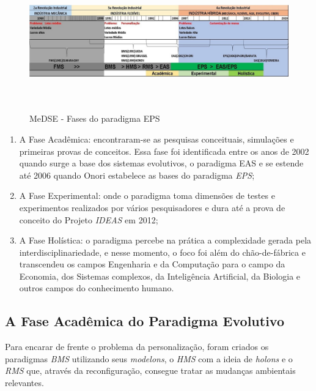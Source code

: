 \begin{figure}[h]
	\centering
	\includegraphics[width=\textwidth, height=6cm]{img/F11_SIAPE_Fases_EPS.jpg} 
	\caption{MeDSE - Fases do paradigma EPS}
	\label{F11}
	
\end{figure}

\begin{enumerate}
	\item A Fase Acadêmica: encontraram-se as pesquisas conceituais, simulações e primeiras provas de conceitos. Essa fase foi identificada entre os anos de 2002 quando surge a base dos sistemas evolutivos, o paradigma EAS e se estende até 2006 quando Onori estabelece as bases do paradigma \textit{EPS};
	
	\item  A Fase Experimental: onde o paradigma toma dimensões de testes e experimentos realizados por vários pesquisadores e dura até a prova de conceito do Projeto \textit{IDEAS} em 2012;
	
	\item  A Fase Holística: o paradigma percebe na prática a complexidade gerada pela interdisciplinariedade, e nesse momento, o foco foi além do chão-de-fábrica e transcendeu os campos Engenharia e da Computação para o campo da Economia, dos Sistemas complexos, da Inteligência Artificial, da Biologia e outros campos do conhecimento humano. 
\end{enumerate}


\subsection{A Fase Acadêmica do Paradigma Evolutivo}

Para encarar de frente o problema da personalização, foram criados os paradigmas \textit{BMS} utilizando seus \textit{modelons}, o \textit{HMS} com a ideia de \textit{holons} e o \textit{RMS} que, através da reconfiguração, consegue tratar as mudanças ambientais relevantes.

